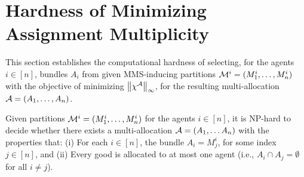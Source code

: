 \section{Hardness of Minimizing Assignment Multiplicity}
\label{sec:reduction}
This section establishes the computational hardness of selecting, for the agents $i \in [n]$, bundles $A_i$ from given MMS-inducing partitions $\mathcal{M}^i = (M^i_1, \dots, M^i_n)$ with the objective of minimizing $\left\|\chi^{\mathcal{A}}\right\|_\infty$, for the resulting multi-allocation $\mathcal{A}=(A_1,\ldots, A_n)$. 

\begin{theorem}
\label{theorem:NPHard}
Given partitions $\mathcal{M}^i = (M^i_1, \dots, M^i_n)$ for the agents $i \in [n]$, it is {\rm NP}-hard to decide whether there exists a multi-allocation $\mathcal{A} = (A_1, \ldots A_n)$ with the properties that: (i) For each $i \in [n]$, the bundle $A_i = M^i_j$, for some index $j \in [n]$, and (ii) Every good is allocated to at most one agent (i.e., $A_i \cap A_j = \emptyset$ for all $i \neq j$).
\end{theorem}
